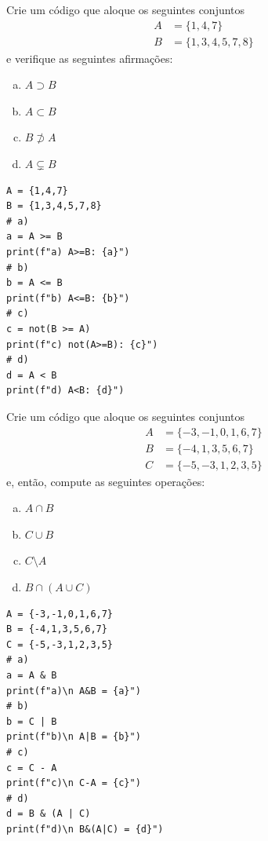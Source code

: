 \begin{exer}
  Crie um código que aloque os seguintes conjuntos
  \begin{align}
    A &= \{1,4,7\}\\
    B &= \{1,3,4,5,7,8\}
  \end{align}
  e verifique as seguintes afirmações:
  \begin{enumerate}[a)]
  \item $A\supset B$
  \item $A\subset B$
  \item $B\not\supset A$
  \item $A\subsetneq B$
  \end{enumerate}
\end{exer}
\begin{resp}

\begin{lstlisting}
A = {1,4,7}
B = {1,3,4,5,7,8}
# a)
a = A >= B
print(f"a) A>=B: {a}")
# b)
b = A <= B
print(f"b) A<=B: {b}")
# c)
c = not(B >= A)
print(f"c) not(A>=B): {c}")
# d)
d = A < B
print(f"d) A<B: {d}")
\end{lstlisting}

\end{resp}

\begin{exer}
  Crie um código que aloque os seguintes conjuntos
  \begin{align}
    A &= \{-3,-1,0,1,6,7\}\\
    B &= \{-4,1,3,5,6,7\}\\
    C &= \{-5,-3,1,2,3,5\}
  \end{align}
  e, então, compute as seguintes operações:
  \begin{enumerate}[a)]
  \item $A\cap B$\\
  \item $C\cup B$\\
  \item $C\setminus A$\\
  \item $B\cap (A\cup C)$
  \end{enumerate}
\end{exer}
\begin{resp}

\begin{lstlisting}
A = {-3,-1,0,1,6,7}
B = {-4,1,3,5,6,7}
C = {-5,-3,1,2,3,5}
# a)
a = A & B
print(f"a)\n A&B = {a}")
# b)
b = C | B
print(f"b)\n A|B = {b}")
# c)
c = C - A
print(f"c)\n C-A = {c}")
# d)
d = B & (A | C)
print(f"d)\n B&(A|C) = {d}")
\end{lstlisting}

\end{resp}

